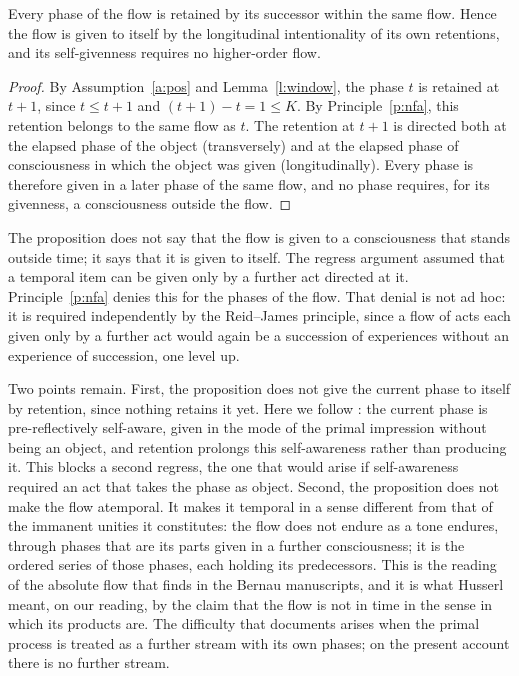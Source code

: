 \documentclass{situationist-preprint}
\begin{document}
\begin{proposition}\label{p:self}
Every phase of the flow is retained by its successor within the same flow. Hence the flow is given to itself by the longitudinal intentionality of its own retentions, and its self-givenness requires no higher-order flow.
\end{proposition}

\begin{proof}
By Assumption~\ref{a:pos} and Lemma~\ref{l:window}, the phase $t$ is retained at $t+1$, since $t\le t+1$ and $(t+1)-t=1\le K$. By Principle~\ref{p:nfa}, this retention belongs to the same flow as $t$. The retention at $t+1$ is directed both at the elapsed phase of the object (transversely) and at the elapsed phase of consciousness in which the object was given (longitudinally). Every phase is therefore given in a later phase of the same flow, and no phase requires, for its givenness, a consciousness outside the flow.
\end{proof}

The proposition does not say that the flow is given to a consciousness that stands outside time; it says that it is given to itself. The regress argument assumed that a temporal item can be given only by a further act directed at it. Principle~\ref{p:nfa} denies this for the phases of the flow. That denial is not ad hoc: it is required independently by the Reid--James principle, since a flow of acts each given only by a further act would again be a succession of experiences without an experience of succession, one level up.

Two points remain. First, the proposition does not give the current phase to itself by retention, since nothing retains it yet. Here we follow \citet{Zahavi2003b,Zahavi2005}: the current phase is pre-reflectively self-aware, given in the mode of the primal impression without being an object, and retention prolongs this self-awareness rather than producing it. This blocks a second regress, the one that would arise if self-awareness required an act that takes the phase as object. Second, the proposition does not make the flow atemporal. It makes it temporal in a sense different from that of the immanent unities it constitutes: the flow does not endure as a tone endures, through phases that are its parts given in a further consciousness; it is the ordered series of those phases, each holding its predecessors. This is the reading of the absolute flow that \citet{Zahavi2004} finds in the Bernau manuscripts, and it is what Husserl meant, on our reading, by the claim that the flow is not in time in the sense in which its products are. The difficulty that \citet{Kortooms2002} documents arises when the primal process is treated as a further stream with its own phases; on the present account there is no further stream.
\end{document}
